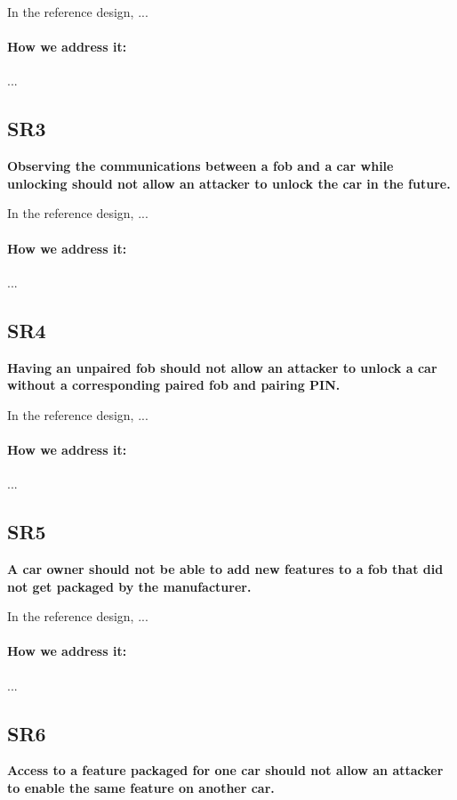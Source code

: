 \documentclass[11pt,oneside,onecolumn,letterpaper]{article}
\begin{document}
In the reference design, ...

\paragraph{How we address it:} ...

\subsection{SR3}
\textbf{Observing the communications between a fob and a car while unlocking should not allow an attacker to unlock the car in the future.}

In the reference design, ...

\paragraph{How we address it:} ...

\subsection{SR4}
\textbf{Having an unpaired fob should not allow an attacker to unlock a car without a corresponding paired fob and pairing PIN.}

In the reference design, ...

\paragraph{How we address it:} ...

\subsection{SR5}
\textbf{A car owner should not be able to add new features to a fob that did not get packaged by the manufacturer.}

In the reference design, ...

\paragraph{How we address it:} ...

\subsection{SR6}
\textbf{Access to a feature packaged for one car should not allow an attacker to enable the same feature on another car.}
\end{document}
